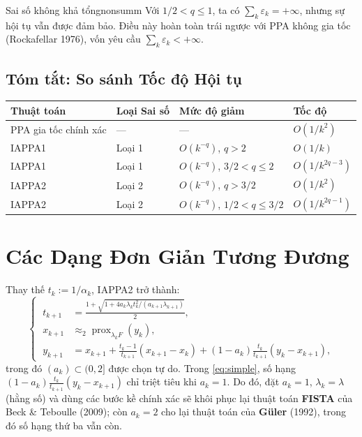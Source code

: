 \documentclass[12pt, a4paper]{article}
\newcommand{\prox}{\operatorname{prox}}
\begin{document}
\begin{remark}{Sai số không khả tổng}{nonsumm}
Với $1/2<q\le 1$, ta có $\sum_k\varepsilon_k=+\infty$,
nhưng sự hội tụ vẫn được đảm bảo.
Điều này hoàn toàn trái ngược với PPA không gia tốc (Rockafellar 1976),
vốn yêu cầu $\sum_k\varepsilon_k<+\infty$.
\end{remark}

\subsection{Tóm tắt: So sánh Tốc độ Hội tụ}

\begin{center}
\renewcommand{\arraystretch}{1.35}
\begin{tabular}{@{}llll@{}}
\toprule
\textbf{Thuật toán} & \textbf{Loại Sai số} & \textbf{Mức độ giảm} & \textbf{Tốc độ} \\
\midrule
PPA gia tốc chính xác & ---     & ---              & $O(1/k^2)$      \\
\midrule
IAPPA1              & Loại 1  & $O(k^{-q})$, $q>2$         & $O(1/k)$        \\
IAPPA1              & Loại 1  & $O(k^{-q})$, $3/2<q\le 2$ & $O(1/k^{2q-3})$ \\
\midrule
IAPPA2              & Loại 2  & $O(k^{-q})$, $q>3/2$          & $O(1/k^2)$      \\
IAPPA2              & Loại 2  & $O(k^{-q})$, $1/2<q\le 3/2$  & $O(1/k^{2q-1})$ \\
\bottomrule
\end{tabular}
\end{center}

\section{Các Dạng Đơn Giản Tương Đương}

Thay thế $t_k:=1/\alpha_k$, IAPPA2 trở thành:
\begin{equation}\label{eq:simple}
\left\{\;
\begin{aligned}
  t_{k+1} &= \tfrac{1+\sqrt{1+4a_k\lambda_k t_k^2/(a_{k+1}\lambda_{k+1})}}{2},\\[4pt]
  x_{k+1} &\approx_2\prox_{\lambda_k F}(y_k),\\[4pt]
  y_{k+1} &= x_{k+1}+\tfrac{t_k-1}{t_{k+1}}(x_{k+1}-x_k)
             +(1-a_k)\tfrac{t_k}{t_{k+1}}(y_k-x_{k+1}),
\end{aligned}
\right.
\end{equation}
trong đó $(a_k)\subset(0,2]$ được chọn tự do.
Trong \eqref{eq:simple}, số hạng $(1-a_k)\tfrac{t_k}{t_{k+1}}(y_k-x_{k+1})$ chỉ triệt tiêu khi $a_k=1$. Do đó, đặt $a_k=1$, $\lambda_k=\lambda$ (hằng số) và dùng các bước kề chính xác sẽ khôi phục lại thuật toán \textbf{FISTA} của Beck \& Teboulle (2009); còn $a_k=2$ cho lại thuật toán của \textbf{G\"{u}ler} (1992), trong đó số hạng thứ ba vẫn còn.
\end{document}
